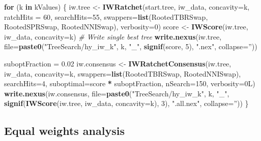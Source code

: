 \documentclass[]{book}
\newenvironment{Shaded}{\begin{snugshade}}{\end{snugshade}}
\newcommand{\KeywordTok}[1]{\textcolor[rgb]{0.13,0.29,0.53}{\textbf{#1}}}
\newcommand{\DataTypeTok}[1]{\textcolor[rgb]{0.13,0.29,0.53}{#1}}
\newcommand{\DecValTok}[1]{\textcolor[rgb]{0.00,0.00,0.81}{#1}}
\newcommand{\FloatTok}[1]{\textcolor[rgb]{0.00,0.00,0.81}{#1}}
\newcommand{\StringTok}[1]{\textcolor[rgb]{0.31,0.60,0.02}{#1}}
\newcommand{\CommentTok}[1]{\textcolor[rgb]{0.56,0.35,0.01}{\textit{#1}}}
\newcommand{\ControlFlowTok}[1]{\textcolor[rgb]{0.13,0.29,0.53}{\textbf{#1}}}
\newcommand{\OperatorTok}[1]{\textcolor[rgb]{0.81,0.36,0.00}{\textbf{#1}}}
\newcommand{\NormalTok}[1]{#1}
\theoremstyle{definition}
\theoremstyle{definition}
\theoremstyle{definition}
\theoremstyle{remark}
\begin{document}
\begin{Shaded}
\begin{Highlighting}[]
\ControlFlowTok{for}\NormalTok{ (k }\ControlFlowTok{in}\NormalTok{ kValues) \{}
\NormalTok{  iw.tree <-}\StringTok{ }\KeywordTok{IWRatchet}\NormalTok{(start.tree, iw_data, }\DataTypeTok{concavity=}\NormalTok{k,}
                       \DataTypeTok{ratchHits =} \DecValTok{60}\NormalTok{, }\DataTypeTok{searchHits=}\DecValTok{55}\NormalTok{,}
                       \DataTypeTok{swappers=}\KeywordTok{list}\NormalTok{(RootedTBRSwap, RootedSPRSwap, RootedNNISwap),}
                       \DataTypeTok{verbosity=}\DecValTok{0}\NormalTok{)}
\NormalTok{  score <-}\StringTok{ }\KeywordTok{IWScore}\NormalTok{(iw.tree, iw_data, }\DataTypeTok{concavity=}\NormalTok{k)}
  \CommentTok{# Write single best tree}
  \KeywordTok{write.nexus}\NormalTok{(iw.tree, }\DataTypeTok{file=}\KeywordTok{paste0}\NormalTok{(}\StringTok{"TreeSearch/hy_iw_k"}\NormalTok{, k, }\StringTok{"_"}\NormalTok{, }\KeywordTok{signif}\NormalTok{(score, }\DecValTok{5}\NormalTok{), }\StringTok{".nex"}\NormalTok{, }\DataTypeTok{collapse=}\StringTok{''}\NormalTok{))}

\NormalTok{  suboptFraction =}\StringTok{ }\FloatTok{0.02}
\NormalTok{  iw.consensus <-}\StringTok{ }\KeywordTok{IWRatchetConsensus}\NormalTok{(iw.tree, iw_data, }\DataTypeTok{concavity=}\NormalTok{k,}
                  \DataTypeTok{swappers=}\KeywordTok{list}\NormalTok{(RootedTBRSwap, RootedNNISwap),}
                  \DataTypeTok{searchHits=}\DecValTok{4}\NormalTok{,}
                  \DataTypeTok{suboptimal=}\NormalTok{score }\OperatorTok{*}\StringTok{ }\NormalTok{suboptFraction,}
                  \DataTypeTok{nSearch=}\DecValTok{150}\NormalTok{, }\DataTypeTok{verbosity=}\NormalTok{0L)}
  \KeywordTok{write.nexus}\NormalTok{(iw.consensus, }\DataTypeTok{file=}\KeywordTok{paste0}\NormalTok{(}\StringTok{"TreeSearch/hy_iw_k"}\NormalTok{, k, }\StringTok{"_"}\NormalTok{, }\KeywordTok{signif}\NormalTok{(}\KeywordTok{IWScore}\NormalTok{(iw.tree, iw_data, }\DataTypeTok{concavity=}\NormalTok{k), }\DecValTok{3}\NormalTok{), }\StringTok{".all.nex"}\NormalTok{, }\DataTypeTok{collapse=}\StringTok{''}\NormalTok{))}
\NormalTok{\}}
\end{Highlighting}
\end{Shaded}

\hypertarget{equal-weights-analysis}{%
\subsection{Equal weights analysis}\label{equal-weights-analysis}}
\end{document}
